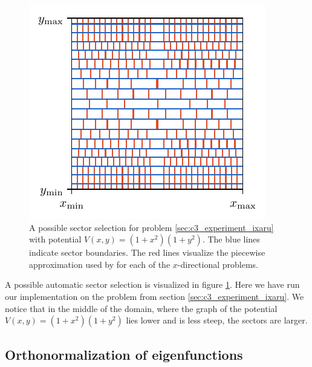 \begin{figure}
  \begin{center}
    \begin{minipage}{.59\textwidth}
      \includegraphics[width=\textwidth]{img/chapter3/sector_example.pdf}
    \end{minipage}
    \begin{minipage}{.4\textwidth}
      \caption{A possible sector selection for problem \ref{sec:c3_experiment_ixaru} with potential $V(x, y) = (1+x^2)(1+y^2)$. The blue lines indicate sector boundaries. The red lines visualize the piecewise approximation used by  for each of the $x$-directional problems.}\label{fig:c3_sector_selection_example}
    \end{minipage}
  \end{center}
\end{figure}

A possible automatic sector selection is visualized in figure \ref{fig:c3_sector_selection_example}. Here we have run our implementation on the problem from section \eqref{sec:c3_experiment_ixaru}. We notice that in the middle of the domain, where the graph of the potential $V(x, y) = (1+x^2)(1+y^2)$ lies lower and is less steep, the sectors are larger.

\subsection{Orthonormalization of eigenfunctions}\label{sec:c3_improvement_orthonormalization}

